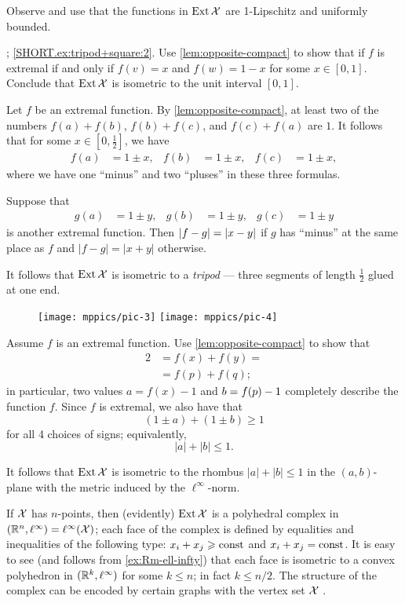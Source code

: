 Observe and use that the functions in $\mathop{\rm Ext}\nolimits\mathcal{X}$ are 1-Lipschitz and uniformly bounded.

\parbf{\ref{ex:tripod+square}}; \ref{SHORT.ex:tripod+square:2}.
Use \ref{lem:opposite-compact} to show that if $f$ is extremal if and only if $f(v)=x$ and $f(w)=1-x$ for some $x\in [0,1]$.
Conclude that $\mathop{\rm Ext}\nolimits\mathcal{X}$ is isometric to the unit interval $[0,1]$.

Let $f$ be an extremal function.
By \ref{lem:opposite-compact}, at least two of the numbers $f(a)+f(b)$, $f(b)+f(c)$, and $f(c)+f(a)$ are $1$.
It follows that for some $x\in[0,\tfrac12]$, we have 
\begin{align*}
f(a)&=1\pm x,&
f(b)&=1\pm x,&
f(c)&=1\pm x,
\end{align*}
where we have one ``minus'' and two ``pluses'' in these three formulas.

Suppose that
\begin{align*}
g(a)&=1\pm y,& g(b)&=1\pm y,& g(c)&=1\pm y
\end{align*}
is another extremal function.
Then $|f-g|\z=|x-y|$ if $g$ has ``minus'' at the same place as $f$ and $|f-g|=|x+y|$ otherwise.

It follows that $\mathop{\rm Ext}\nolimits\mathcal{X}$ is isometric to a {}\emph{tripod} --- three segments of length $\tfrac12$ glued at one end.

\begin{wrapfigure}{r}{27 mm}
\vskip-6mm
\centering
\texttt{[image: mppics/pic-3]}
\bigskip
\texttt{[image: mppics/pic-4]}
\end{wrapfigure}

Assume $f$ is an extremal function.
Use \ref{lem:opposite-compact} to show that
\begin{align*}
2&=f(x)+f(y)=
\\
&=f(p)+f(q);
\end{align*}
in particular, two values $a=f(x)-1$ and $b\z=f(p)-1$ completely describe the function $f$.
Since $f$ is extremal, we also have that 
\[(1\pm a)+(1\pm b)\ge 1\]
for all 4 choices of signs;
equivalently, 
\[|a|+|b|\le 1.\]

It follows that $\mathop{\rm Ext}\nolimits\mathcal{X}$ is isometric to the rhombus $|a|+|b|\le 1$ in the $(a,b)$-plane with the metric induced by the $\ell^\infty$-norm.

If $\mathcal{X}$ has $n$-points, then (evidently) $\mathop{\rm Ext}\nolimits\mathcal{X}$ is a polyhedral complex in $(\RR^n,\ell^\infty) \z=\ell^\infty(\spc{X})$;
each face of the complex is defined by equalities and inequalities of the following type: $x_i+x_j\geqslant \operatorname{\rm const}\nolimits$ and  $x_i+x_j= \operatorname{\rm const}\nolimits$.
It is easy to see (and follows from \ref{ex:Rm-ell-infty}) that each face is isometric to a convex polyhedron in  $(\mathbb{R}^k,\ell^\infty)$ for some $k\le n$;
in fact $k\le n/2$.
The structure of the complex can be encoded by certain graphs with the vertex set $\mathcal{X}$ \cite[see Section 4 in][]{lang-2013}.

